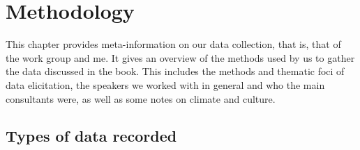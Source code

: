 \chapter{Methodology} 
\label{ChapterMeth}
\largerpage

\begin{sloppypar}
This chapter provides meta-information on our data collection, that is, that of the work group and me. It gives an overview of the methods used by us to gather the data discussed in the book. This includes the methods and thematic foci of data elicitation, the speakers we worked with in general and who the main consultants were, as well as some notes on climate and culture.
\end{sloppypar}

\label{sec:Meth}



\section{Types of data recorded}

